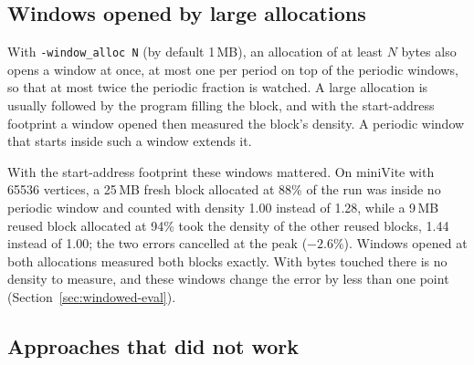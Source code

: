\documentclass[11pt]{article}
\newcommand{\knob}[1]{\texttt{-#1}}
\newcommand{\secref}[1]{Section~\ref{#1}}
\begin{document}
\subsection{Windows opened by large allocations}
\label{sec:allocwindows}

With \knob{window\_alloc N} (by default 1\,MB), an allocation of at least $N$ bytes also opens a window at once, at most one per period on top of the periodic windows, so that at most twice the periodic fraction is watched. A large allocation is usually followed by the program filling the block, and with the start-address footprint a window opened then measured the block's density. A periodic window that starts inside such a window extends it.

With the start-address footprint these windows mattered. On miniVite with 65536 vertices, a 25\,MB fresh block allocated at 88\% of the run was inside no periodic window and counted with density 1.00 instead of 1.28, while a 9\,MB reused block allocated at 94\% took the density of the other reused blocks, 1.44 instead of 1.00; the two errors cancelled at the peak ($-2.6\%$). Windows opened at both allocations measured both blocks exactly. With bytes touched there is no density to measure, and these windows change the error by less than one point (\secref{sec:windowed-eval}).

\subsection{Approaches that did not work}
\label{sec:history}
\end{document}
